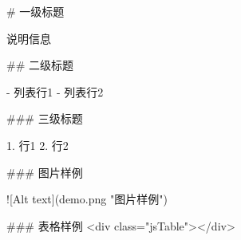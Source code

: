﻿# 一级标题

说明信息

## 二级标题

- 列表行1
- 列表行2

### 三级标题

1. 行1
2. 行2

### 图片样例

![Alt text](demo.png "图片样例")

### 表格样例
<div class="jsTable"></div>